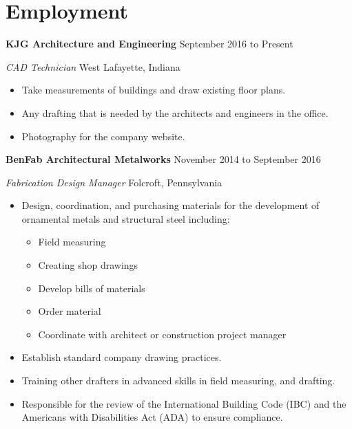 \documentclass[9pt]{extarticle}
\begin{document}
\section*{Employment} 

\textbf{KJG Architecture and Engineering} \hfill September 2016 to Present

\textit{CAD Technician} \hfill West Lafayette, Indiana

\begin{itemize}
    \item Take measurements of buildings and draw existing floor plans. 
    \item Any drafting that is needed by the architects and engineers in the office.
    \item Photography for the company website.
    \end{itemize}

\textbf{BenFab Architectural Metalworks} \hfill November 2014 to September 2016

\textit{Fabrication Design Manager} \hfill Folcroft, Pennsylvania

\begin{itemize}
    \item Design, coordination, and purchasing materials for the development of ornamental metals and structural steel including: 
        \begin{multicols}{3}
        \begin{itemize}
            \item Field measuring
            \item Creating shop drawings 
            \item Develop bills of materials 
            \item Order material  
            \item Coordinate with architect or construction project manager
            \end{itemize}
        \end{multicols}
    \item Establish standard company drawing practices.
    \item Training other drafters in advanced skills in field measuring, and drafting. 
    \item Responsible for the review of the International Building Code (IBC) and the Americans with Disabilities Act (ADA) to ensure compliance.
\end{itemize}

\hfill
\end{document}
